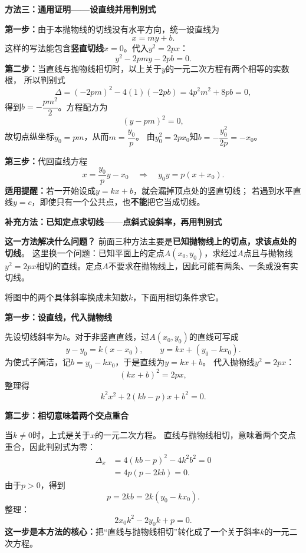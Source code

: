 \begin{proofbox}
\medskip
\begin{minipage}{\linewidth}
\textbf{方法三：通用证明——设直线并用判别式}
\begin{center}\end{center}
\end{minipage}\par\medskip

\textbf{第一步：}由于本抛物线的切线没有水平方向，统一设直线为
\[
    x=my+b.
\]
这样的写法能包含\textbf{竖直切线$x=0$}。代入$y^2=2px$：
\[
    y^2-2pmy-2pb=0.
\]
\textbf{第二步：}当直线与抛物线相切时，以上关于$y$的一元二次方程有两个相等的实数根，
所以判别式
\[
    \Delta=(-2pm)^2-4(1)(-2pb)=4p^2m^2+8pb=0,
\]
得到$b=-\dfrac{pm^2}{2}$。方程配方为
\[
    (y-pm)^2=0,
\]
故切点纵坐标$y_0=pm$，从而$m=\dfrac{y_0}{p}$。
由$y_0^2=2px_0$知$b=-\dfrac{y_0^2}{2p}=-x_0$。

\textbf{第三步：}代回直线方程
\[
    x=\frac{y_0}{p}y-x_0
    \quad\Longrightarrow\quad
    \boxed{y_0y=p(x+x_0)}.
\]
\textbf{适用提醒：}若一开始设成$y=kx+b$，就会漏掉顶点处的竖直切线；
若遇到水平直线$y=c$，即使只有一个公共点，也\textbf{不能}把它当成切线。


\medskip
\textbf{补充方法：已知定点求切线——点斜式设斜率，再用判别式}

\textbf{这一方法解决什么问题？}
前面三种方法主要是\textbf{已知抛物线上的切点，求该点处的切线}。
这里换一个问题：已知平面上的定点$A(x_0,y_0)$，求经过$A$点且与抛物线
$y^2=2px$相切的直线。定点$A$不要求在抛物线上，因此可能有两条、一条或没有实切线。

\begin{center}\end{center}
将图中的两个具体斜率换成未知数$k$，下面用相切条件求它。

\textbf{第一步：设直线，代入抛物线}

先设切线斜率为$k$。对于非竖直直线，过$A(x_0,y_0)$的直线可写成
\[
    y-y_0=k(x-x_0),
    \qquad
    y=kx+(y_0-kx_0).
\]
为使式子简洁，记$b=y_0-kx_0$，于是直线为$y=kx+b$。
代入抛物线$y^2=2px$：
\[
    (kx+b)^2=2px,
\]
整理得
\[
    k^2x^2+2(kb-p)x+b^2=0.
\]

\textbf{第二步：相切意味着两个交点重合}

当$k\ne0$时，上式是关于$x$的一元二次方程。
直线与抛物线相切，意味着两个交点重合，因此判别式为零：
\[
\begin{aligned}
    \Delta_x
    &=4(kb-p)^2-4k^2b^2=0\\
    &=4p(p-2kb)=0.
\end{aligned}
\]
由于$p>0$，得到
\[
    p=2kb=2k(y_0-kx_0).
\]
整理：
\[
    \boxed{2x_0k^2-2y_0k+p=0}.
\]
\textbf{这一步是本方法的核心：}把“直线与抛物线相切”转化成了一个关于斜率$k$的一元二次方程。


\end{proofbox}
